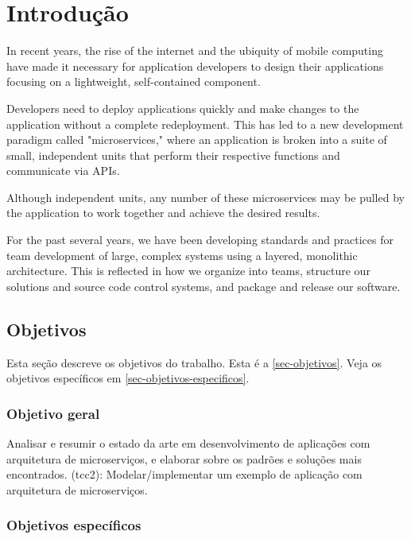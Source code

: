 \chapter{Introdução}

In recent years, the rise of the internet and the ubiquity of mobile computing have made it necessary for application developers to design their applications focusing on a lightweight, self-contained component.

Developers need to deploy applications quickly and make changes to the application without a complete redeployment. This has led to a new development paradigm called "microservices," where an application is broken into a suite of small, independent units that perform their respective functions and communicate via APIs.

Although independent units, any number of these microservices may be pulled by the application to work together and achieve the desired results.

For the past several years, we have been developing standards and practices for team development of large, complex systems using a layered, monolithic architecture. This is reflected in how we organize into teams, structure our solutions and source code control systems, and package and release our software. 


\section{Objetivos}\label{sec-objetivos}

Esta seção descreve os objetivos do trabalho. Esta é a
\autoref{sec-objetivos}. Veja os objetivos específicos em \autoref{sec-objetivos-especificos}.

\subsection{Objetivo geral}\label{sec-objetivo-geral}

Analisar e resumir o estado da arte em desenvolvimento de aplicações com arquitetura de microserviços, e elaborar sobre os padrões e soluções mais encontrados. (tcc2): Modelar/implementar um exemplo de aplicação com arquitetura de microserviços.

\subsection{Objetivos específicos}\label{sec-objetivos-especificos}

